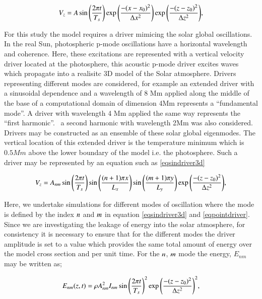 \documentclass[final,1p]{elsarticle}
\begin{document}
\begin{equation}\label{eqpointdriver}
V_{z}=A \sin{\left({2\pi t}\over{T_s} \right)  }  \exp{\left( -{(x-x_0)^{2}}\over{\Delta x^{2}} \right) } \exp{\left( -{(z-z_0)^{2}}\over{\Delta z^{2}} \right) },
\end{equation}

For this study the model requires a driver mimicing the solar global oscillations.    In the real Sun, photospheric p-mode oscillations have a horizontal wavelength and coherence. Here, these excitations are represented with a vertical velocity driver located at the photosphere, this acoustic p-mode driver excites waves which propagate into a realisitc 3D model of the Solar atmosphere. Drivers representing different modes are considered, for example  an extended driver with a sinusoidal dependence and a wavelength of 8 Mm applied along the middle of the base of a computational domain of dimension 4Mm represents  a “fundamental mode”. A driver with wavelength 4 Mm applied the same way represents the “first harmonic”.  \ a second harmonic with wavelength 2Mm was also considered. Drivers may be constructed as an ensemble of these solar global eigenmodes.  The vertical location of this extended driver is the temperature minimum which is $0.5Mm$ above the lower boundary of the model i.e. the photosphere. Such a driver may be represented by an equation such as  \eqref{eqsindriver3d}

\begin{equation}\label{eqsindriver3d}
V_{z}=A_{nm} \sin{\left({2\pi t}\over{T_s} \right)  }\sin{\left(  {(n+1)\pi x}\over{L_x} \right)}   \sin{\left(  {(m+1)\pi y}\over{L_y} \right)}    \exp{\left( -{(z-z_0)^{2}}\over{\Delta z^{2}} \right) },
\end{equation}

Here, we undertake simulations for different modes of oscillation where the mode is defined by the index $\it{n}$ and $\it{m}$ in equation \eqref{eqsindriver3d} and \eqref{eqpointdriver}. Since we are investigating the leakage of energy into the solar atmosphere, for consistency it is necessary to ensure that for the different modes the driver amplitude is set to a value which provides the same total amount of energy over the model cross section and per unit time. For the $\it{n}$, $\it{m}$ mode the energy, $E_{nm}$ may be written as;

\begin{equation}\label{eqdriverenergy}
E_{nm}(z,t)= \rho A_{nm}^{2} I_{nm}  \sin{\left({2\pi t}\over{T_s} \right)  }^{2}    \exp{\left( -{(z-z_0)^{2}}\over{\Delta z^{2}} \right) }^{2},
\end{equation}
\end{document}
